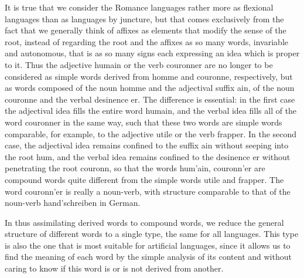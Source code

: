 {    It is true that we consider the Romance languages rather more as
    flexional languages than as languages by juncture, but that comes
    exclusively from the fact that we generally think of affixes as
    elements that modify the sense of the root, instead of regarding
    the root and the affixes as so many words, invariable and
    autonomous, that is as so many signs each expressing an idea which
    is proper to it. Thus the adjective \textup{humain} or the verb
    \textup{couronner} are no longer to be considered as simple words
    derived from \textup{homme} and \textup{ couronne}, respectively,
    but as words composed of the noun \textup{homme} and the
    adjectival suffix \textup{ain}, of the noun \textup{couronne} and
    the verbal desinence \textup{er}. The difference is essential: in
    the first case the adjectival idea fills the entire word
    \textup{humain}, and the verbal idea fills all of the word
    \textup{couronner} in the same way, such that these two words are
    simple words comparable, for example, to the adjective
    \textup{utile} or the verb \textup{frapper}.  In the second case,
    the adjectival idea remains confined to the suffix \textup{ain}
    without seeping into the root \textup{hum}, and the verbal idea
    remains confined to the desinence \textup{er} without penetrating
    the root \textup{couronn}, so that the words \textup{hum'ain},
    \textup{couronn'er} are compound words quite different from the
    simple words \textup{utile} and \textup{frapper}. The word
    \textup{couronn'er} is really a noun-verb, with structure
    comparable to that of the noun-verb \textup{hand'schreiben} in
    German.

    In thus assimilating derived words to compound words, we reduce
    the general structure of different words to a single type, the
    same for all languages.  This type is also the one that is most
    suitable for artificial languages, since it allows us to find the
    meaning of each word by the simple analysis of its content and
    without caring to know if this word is or is not derived from
    another.}

